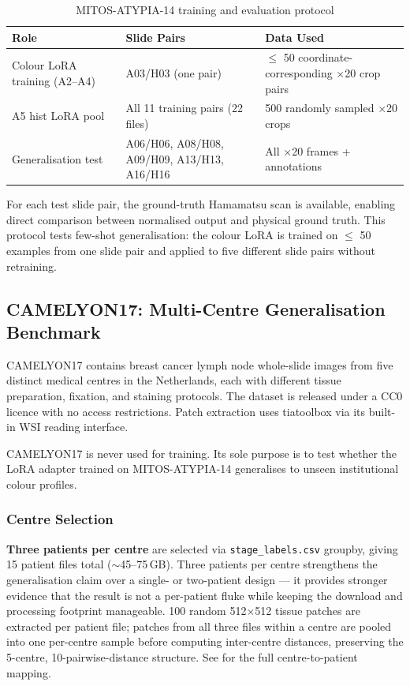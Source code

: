 \documentclass[a4paper,twoside,12pt]{report}
\begin{document}
\begin{table}[ht]
\centering
\small
\setlength{\tabcolsep}{3pt}
\caption{MITOS-ATYPIA-14 training and evaluation protocol}
\label{tab:split}
\begin{tabularx}{\textwidth}{L{0.30\textwidth}L{0.37\textwidth}Y}
\toprule
\textbf{Role} & \textbf{Slide Pairs} & \textbf{Data Used} \\
\midrule
Colour LoRA training (A2--A4) & A03/H03 (one pair) & $\leq$ 50 coordinate-corresponding $\times$20 crop pairs \\
A5 hist LoRA pool & All 11 training pairs (22 files) & 500 randomly sampled $\times$20 crops \\
\midrule
Generalisation test & A06/H06, A08/H08, A09/H09, A13/H13, A16/H16 & All $\times$20 frames + annotations \\
\bottomrule
\end{tabularx}
\end{table}

For each test slide pair, the ground-truth Hamamatsu scan is available, enabling direct comparison between normalised output and physical ground truth. This protocol tests few-shot generalisation: the colour LoRA is trained on $\leq$ 50 examples from one slide pair and applied to five different slide pairs without retraining.

\subsection{CAMELYON17: Multi-Centre Generalisation Benchmark}

CAMELYON17 \citep{bandi2018camelyon17} contains breast cancer lymph node whole-slide images from five distinct medical centres in the Netherlands, each with different tissue preparation, fixation, and staining protocols. The dataset is released under a CC0 licence with no access restrictions. Patch extraction uses tiatoolbox \citep{tialab2022tiatoolbox} via its built-in WSI reading interface.

CAMELYON17 is never used for training. Its sole purpose is to test whether the LoRA adapter trained on MITOS-ATYPIA-14 generalises to unseen institutional colour profiles.

\subsubsection{Centre Selection}

\textbf{Three patients per centre} are selected via \texttt{stage\_labels.csv} groupby, giving 15 patient files total ($\sim$45--75\,GB). Three patients per centre strengthens the generalisation claim over a single- or two-patient design --- it provides stronger evidence that the result is not a per-patient fluke while keeping the download and processing footprint manageable. 100 random 512$\times$512 tissue patches are extracted per patient file; patches from all three files within a centre are pooled into one per-centre sample before computing inter-centre distances, preserving the 5-centre, 10-pairwise-distance structure. See  for the full centre-to-patient mapping.
\end{document}

